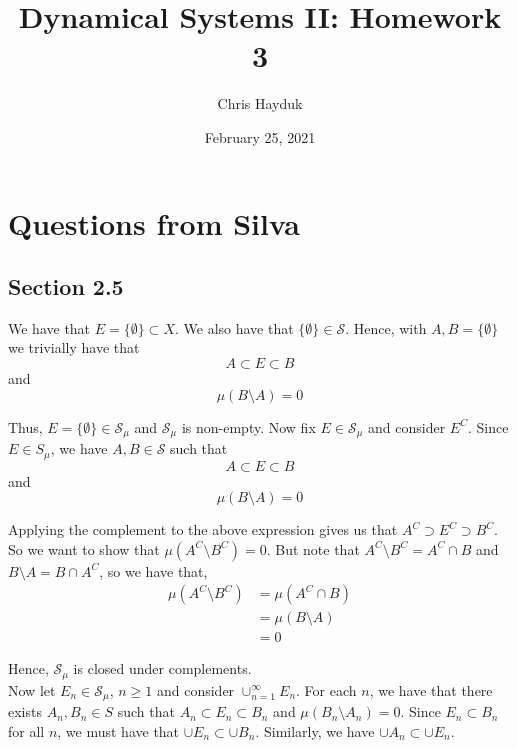 \documentclass[12pt]{article}
\newenvironment{problem}[2][Problem]{\begin{trivlist}
\item[\hskip \labelsep {\bfseries #1}\hskip \labelsep {\bfseries #2.}]}{\end{trivlist}}
\begin{document}
\title{Dynamical Systems II: Homework 3}

\author{Chris Hayduk}
\date{February 25, 2021}

\maketitle

\section{Questions from Silva}

\subsection{Section 2.5}

\begin{problem}{14}
\end{problem}

We have that $E = \{\emptyset\} \subset X$. We also have that $\{\emptyset\} \in \mathcal{S}$. Hence, with $A, B = \{\emptyset\}$ we trivially have that $$A \subset E \subset B$$ and $$\mu(B \setminus A) = 0$$

Thus, $E = \{\emptyset\} \in \mathcal{S}_{\mu}$ and $\mathcal{S}_{\mu}$ is non-empty. Now fix $E \in \mathcal{S}_{\mu}$ and consider $E^C$. Since $E \in S_{\mu}$, we have $A, B \in \mathcal{S}$ such that $$A \subset E \subset B$$ and $$\mu(B \setminus A) = 0$$

Applying the complement to the above expression gives us that $A^C \supset E^C \supset B^C$. So we want to show that $\mu(A^C \setminus B^C) = 0$. But note that $A^C \setminus B^C = A^C \cap B$ and $B \setminus A = B \cap A^C$, so we have that,
\begin{align*}
\mu(A^C \setminus B^C) &= \mu(A^C \cap B)\\
&= \mu(B \setminus A)\\
&= 0
\end{align*}

Hence, $\mathcal{S}_{\mu}$ is closed under complements.\\

Now let $E_n \in \mathcal{S}_{\mu}$, $n \geq 1$ and consider $\cup_{n=1}^{\infty} E_n$. For each $n$, we have that there exists $A_n, B_n \in S$ such that $A_n \subset E_n \subset B_n$ and $\mu(B_n \setminus A_n) = 0$. Since $E_n \subset B_n$ for all $n$, we must have that $\cup E_n \subset \cup B_n$. Similarly, we have $\cup A_n \subset \cup E_n$.\\
\end{document}
